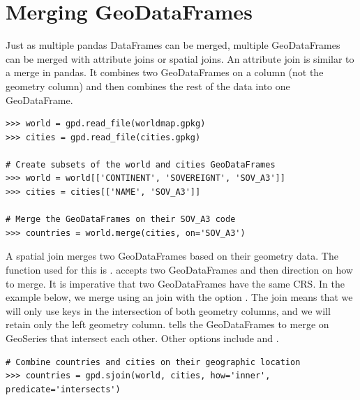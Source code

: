 \section*{Merging GeoDataFrames} %

Just as multiple pandas DataFrames can be merged, multiple GeoDataFrames can be merged with attribute joins or spatial joins.
An attribute join is similar to a merge in pandas.
It combines two GeoDataFrames on a column (not the geometry column) and then combines the rest of the data into one GeoDataFrame.

\begin{lstlisting}
>>> world = gpd.read_file(worldmap.gpkg)
>>> cities = gpd.read_file(cities.gpkg)

# Create subsets of the world and cities GeoDataFrames
>>> world = world[['CONTINENT', 'SOVEREIGNT', 'SOV_A3']]
>>> cities = cities[['NAME', 'SOV_A3']]

# Merge the GeoDataFrames on their SOV_A3 code
>>> countries = world.merge(cities, on='SOV_A3')
\end{lstlisting}

A spatial join merges two GeoDataFrames based on their geometry data.
The function used for this is .
 accepts two GeoDataFrames and then direction on how to merge.
It is imperative that two GeoDataFrames have the same CRS.
In the example below, we merge using an  join with the option .
The  join means that we will only use keys in the intersection of both geometry columns, and we will retain only the left geometry column.
 tells the GeoDataFrames to merge on GeoSeries that intersect each other.
Other options include  and .

\begin{lstlisting}
# Combine countries and cities on their geographic location
>>> countries = gpd.sjoin(world, cities, how='inner', predicate='intersects')
\end{lstlisting}

